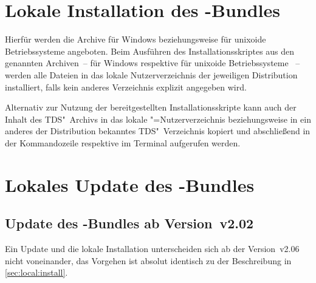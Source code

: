 \section{Lokale Installation des \TUDScript-Bundles}
%
%
%

Hierfür werden die Archive  
für Windows beziehungsweise  für 
unixoide Betriebssysteme angeboten. Beim Ausführen des Installationsskriptes 
aus den genannten Archiven~-- für Windows  
respektive für unixoide Betriebssysteme ~-- 
werden alle Dateien in das lokale Nutzerverzeichnis der jeweiligen Distribution 
installiert, falls kein anderes Verzeichnis explizit angegeben wird. 


Alternativ zur Nutzung der bereitgestellten Installationsskripte kann auch der 
Inhalt des TDS"~Archivs  in das lokale 
"=Nutzerverzeichnis beziehungsweise in ein anderes der Distribution 
bekanntes TDS"~Verzeichnis kopiert und abschließend in der Kommandozeile 
respektive im Terminal  aufgerufen werden. 



\section{Lokales Update des \TUDScript-Bundles}
%
%
%
\subsection{Update des \TUDScript-Bundles ab Version~v2.02}
Ein Update und die lokale Installation unterscheiden sich ab der Version~v2.06 
nicht voneinander, das Vorgehen ist absolut identisch zu der Beschreibung in 
\autoref{sec:local:install}.

